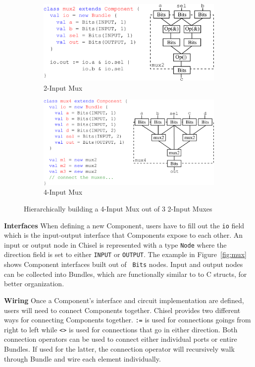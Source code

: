 \begin{figure}
\centering
  \begin{subfigure}[t]{0.48\textwidth}
  \centering
  \includegraphics[width=\textwidth]{figures/mux2.pdf}
  \caption{2-Input Mux}
  \label{fig:mux2}
  \end{subfigure}
  \hfill
  \begin{subfigure}[t]{0.48\textwidth}
  \centering
  \includegraphics[width=\textwidth]{figures/mux4.pdf}
  \caption{4-Input Mux}
  \label{fig:mux4}
  \end{subfigure}
  \caption{Hierarchically building a 4-Input Mux out of 3 2-Input Muxes}
  \label{fig:muxcomp}
\end{figure}

{\bf Interfaces} When defining a new Component, users have to fill out
the {\tt io} field which is the input-output interface that
Components expose to each other. An input or output node in Chisel is
represented with a type {\tt Node} where the direction field is set to
either {\tt INPUT} or {\tt OUTPUT}. The example in
Figure~\ref{fig:mux} shows Component interfaces built out of {\tt
Bits} nodes. Input and output nodes can be
collected into Bundles, which are functionally similar to to C
structs, for better organization. 

{\bf Wiring} Once a Component's interface and circuit
implementation are defined, users will need to connect Components
together. Chisel provides two different ways for connecting
Components together. {\tt :=} is used for connections goings from
right to left while {\tt <>} is used for connections that go in either
direction. Both connection operators can be used to connect either individual
ports or entire Bundles. If used for the latter, the connection
operator will recursively walk through Bundle and wire each element
individually.


